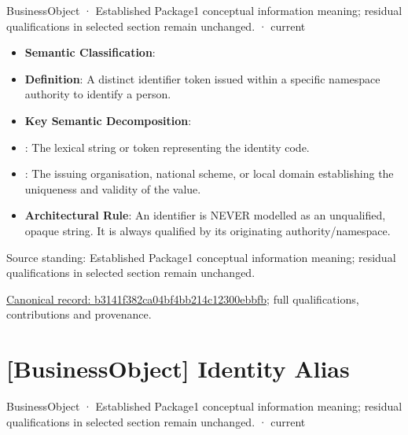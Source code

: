 \label{element:b3141f382ca04bf4bb214c12300ebbfb}
{\small BusinessObject · Established Package1 conceptual information meaning; residual qualifications in selected section remain unchanged. · current}\par

\begin{itemize}


\item \textbf{Semantic Classification}: \texttt{}

\item \textbf{Definition}: A distinct identifier token issued within a specific namespace authority to identify a person.

\item \textbf{Key Semantic Decomposition}:

\item \texttt{}: The lexical string or token representing the identity code.

\item \texttt{}: The issuing organisation, national scheme, or local domain establishing the uniqueness and validity of the value.

\item \textbf{Architectural Rule}: An identifier is NEVER modelled as an unqualified, opaque string. It is always qualified by its originating authority/namespace.

\end{itemize}


Source standing: Established Package1 conceptual information meaning; residual qualifications in selected section remain unchanged.


{\footnotesize \href{../../../../continuum/business/business-object/b3141f382ca04bf4bb214c12300ebbfb.md}{Canonical record: b3141f382ca04bf4bb214c12300ebbfb}; full qualifications, contributions and provenance.}\par
\section{[BusinessObject] Identity Alias}

\label{element:b444496792a24c33b439f9cb59a12d98}
{\small BusinessObject · Established Package1 conceptual information meaning; residual qualifications in selected section remain unchanged. · current}\par

